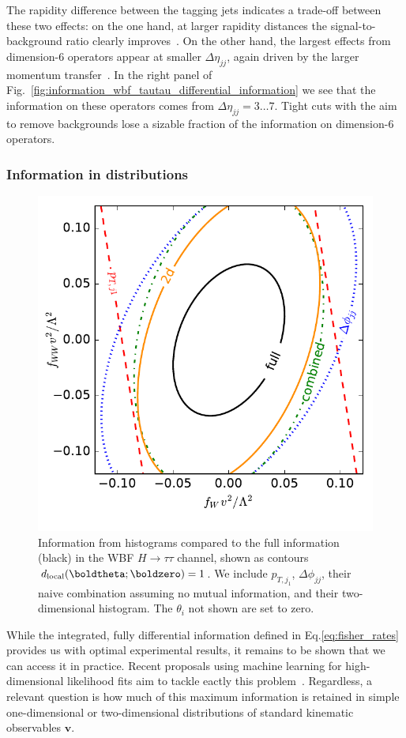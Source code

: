The rapidity difference between the tagging jets indicates a trade-off
between these two effects: on the one hand, at larger rapidity
distances the signal-to-background ratio clearly
improves~\cite{phi_jj}. On the other hand, the largest effects from
dimension-6 operators appear at smaller $\Delta \eta_{jj}$, again
driven by the larger momentum transfer~\cite{eft-edge}. In the right panel of
Fig.~\ref{fig:information_wbf_tautau_differential_information} we see that the
information on these operators comes from $\Delta \eta_{jj} =
3\dots7$. Tight cuts with the aim to remove backgrounds lose a sizable
fraction of the information on dimension-6 operators.



\subsubsection*{Information in distributions}

\begin{figure}[b]
  \includegraphics[height=0.45 \textwidth]{fig/information/wbf_tautau_histos_contours}
  \caption{Information from histograms compared to the full
    information  (black) in the WBF $H \to \tau \tau$ channel, shown as contours
    $d_{\text{local}}(\boldtheta ; \boldzero) = 1$. We include
    $p_{T,j_1}$, $\Delta \phi_{jj}$, their naive combination assuming
    no mutual information, and their two-dimensional histogram. The
    $\theta_i$ not shown are set to zero.}
  \label{fig:information_wbf_tautau_histograms_contours}
\end{figure}

While the integrated, fully differential information defined in
Eq.\;\eqref{eq:fisher_rates} provides us with optimal experimental
results, it remains to be shown that we can access it in
practice. Recent proposals using machine learning for high-dimensional
likelihood fits aim to tackle eactly this problem~\cite{machine_learning}.
Regardless, a relevant question is how much of this maximum
information is retained in simple one-dimensional or two-dimensional
distributions of standard kinematic observables $\mathbf{v}$. 

